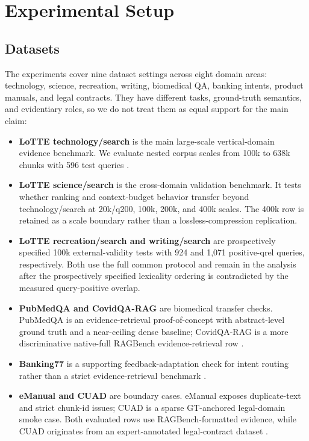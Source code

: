 
\section{Experimental Setup}
\label{sec:05-experimental-setup:experimental-setup}

\subsection{Datasets}
\label{sec:05-experimental-setup:datasets}

The experiments cover nine dataset settings across eight domain areas: technology, science, recreation, writing, biomedical QA, banking intents, product manuals, and legal contracts. They have different tasks, ground-truth semantics, and evidentiary roles, so we do not treat them as equal support for the main claim:

\begin{itemize}
\item \textbf{LoTTE technology/search} is the main large-scale vertical-domain evidence benchmark. We evaluate nested corpus scales from 100k to 638k chunks with 596 test queries \citep{santhanam2022colbertv2}.
\item \textbf{LoTTE science/search} is the cross-domain validation benchmark. It tests whether ranking and context-budget behavior transfer beyond technology/search at 20k/q200, 100k, 200k, and 400k scales. The 400k row is retained as a scale boundary rather than a lossless-compression replication.
\item \textbf{LoTTE recreation/search and writing/search} are prospectively specified 100k external-validity tests with 924 and 1,071 positive-qrel queries, respectively. Both use the full common protocol and remain in the analysis after the prospectively specified lexicality ordering is contradicted by the measured query-positive overlap.
\item \textbf{PubMedQA and CovidQA-RAG} are biomedical transfer checks. PubMedQA is an evidence-retrieval proof-of-concept with abstract-level ground truth and a near-ceiling dense baseline; CovidQA-RAG is a more discriminative native-full RAGBench evidence-retrieval row \citep{jin2019pubmedqa,friel2024ragbench}.
\item \textbf{Banking77} is a supporting feedback-adaptation check for intent routing rather than a strict evidence-retrieval benchmark \citep{casanueva2020banking77}.
\item \textbf{eManual and CUAD} are boundary cases. eManual exposes duplicate-text and strict chunk-id issues; CUAD is a sparse GT-anchored legal-domain smoke case. Both evaluated rows use RAGBench-formatted evidence, while CUAD originates from an expert-annotated legal-contract dataset \citep{friel2024ragbench,hendrycks2021cuad}.
\end{itemize}

